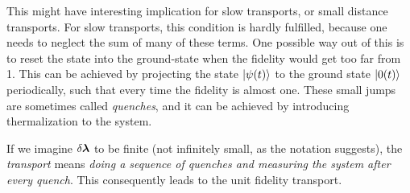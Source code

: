 This might have interesting implication for slow transports, or small distance transports. For slow transports, this condition is hardly fulfilled, because one needs to neglect the sum of many of these terms. One possible way out of this is to reset the state into the ground-state when the fidelity would get too far from 1. This can be achieved by projecting the state $\ket{\psi(t)}$ to the ground state $\ket{0(t)}$ periodically, such that every time the fidelity is almost one. These small jumps are sometimes called \emph{quenches}, and it can be achieved by introducing thermalization to the system.






If we imagine $\delta{\bm\lambda}$ to be finite (not infinitely small, as the notation suggests), the \emph{transport} means \emph{doing a sequence of quenches and measuring the system after every quench}. This consequently leads to the unit fidelity transport.













